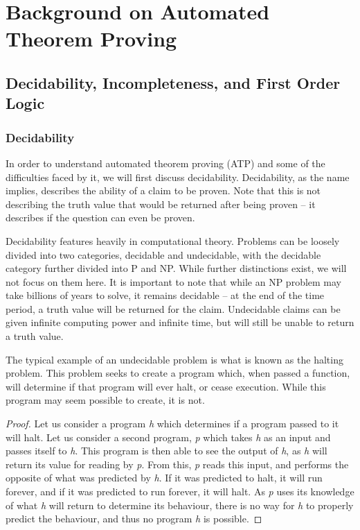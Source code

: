 \chapter{Background on Automated Theorem Proving}

\section{Decidability, Incompleteness, and First Order Logic}
\subsection{Decidability}
In order to understand automated theorem proving (ATP) and some of the difficulties faced by it, we will first discuss decidability. Decidability, as the name implies, describes the ability of a claim to be proven. Note that this is not describing the truth value that would be returned after being proven -- it describes if the question can even be proven. 

Decidability features heavily in computational theory. Problems can be loosely divided into two categories, decidable and undecidable, with the decidable category further divided into P and NP. While further distinctions exist, we will not focus on them here. It is important to note that while an NP problem may take billions of years to solve, it remains decidable -- at the end of the time period, a truth value will be returned for the claim. Undecidable claims can be given infinite computing power and infinite time, but will still be unable to return a truth value.

The typical example of an undecidable problem is what is known as the halting problem. This problem seeks to create a program which, when passed a function, will determine if that program will ever halt, or cease execution. While this program may seem possible to create, it is not.

\begin{proof}
Let us consider a program \textit{h} which determines if a program passed to it will halt. Let us consider a second program, \textit{p} which takes \textit{h} as an input and passes itself to \textit{h}. This program is then able to see the output of \textit{h}, as \textit{h} will return its value for reading by \textit{p}. From this, \textit{p} reads this input, and performs the opposite of what was predicted by \textit{h}. If it was predicted to halt, it will run forever, and if it was predicted to run forever, it will halt. As \textit{p} uses its knowledge of what \textit{h} will return to determine its behaviour, there is no way for \textit{h} to properly predict the behaviour, and thus no program \textit{h} is possible.
\end{proof}

